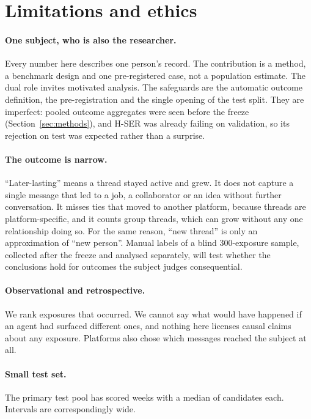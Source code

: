 \documentclass[11pt]{article}
\begin{document}
\section{Limitations and ethics}

\paragraph{One subject, who is also the researcher.} Every number here describes one person's record. The contribution is a method, a benchmark design and one pre-registered case, not a population estimate. The dual role invites motivated analysis. The safeguards are the automatic outcome definition, the pre-registration and the single opening of the test split. They are imperfect: pooled outcome aggregates were seen before the freeze (Section~\ref{sec:methods}), and H-SER was already failing on validation, so its rejection on test was expected rather than a surprise.

\paragraph{The outcome is narrow.} ``Later-lasting'' means a thread stayed active and grew. It does not capture a single message that led to a job, a collaborator or an idea without further conversation. It misses ties that moved to another platform, because threads are platform-specific, and it counts group threads, which can grow without any one relationship doing so. For the same reason, ``new thread'' is only an approximation of ``new person''. Manual labels of a blind 300-exposure sample, collected after the freeze and analysed separately, will test whether the conclusions hold for outcomes the subject judges consequential.

\paragraph{Observational and retrospective.} We rank exposures that occurred. We cannot say what would have happened if an agent had surfaced different ones, and nothing here licenses causal claims about any exposure. Platforms also chose which messages reached the subject at all.

\paragraph{Small test set.} The primary test pool has \nPTeScored{} scored weeks with a median of \nPTeMedian{} candidates each. Intervals are correspondingly wide.
\end{document}
